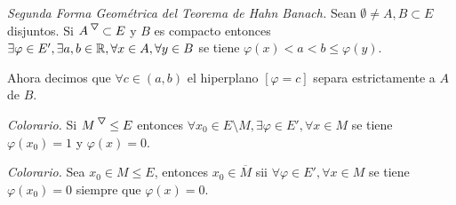 \begin{theorem}
    \emph{Segunda Forma Geométrica del Teorema de Hahn Banach.} Sean \(\emptyset \neq A,B \subset E\) disjuntos. Si \(A^\ce\subset E\) y \(B\) es compacto entonces \(\exists \varphi \in E', \exists a,b \in \mathbb{R}, \forall x\in A, \forall y\in B\) se tiene \(\varphi(x) < a <b \leq \varphi(y)\). 
\end{theorem}
\begin{note}
    Ahora decimos que \(\forall c\in (a,b)\) el hiperplano \([\varphi = c]\) separa estrictamente a \(A\) de \(B\). 
\end{note}
\begin{note}
    \emph{Colorario.} Si \(M^\ce\leq E\) entonces \(\forall x_0\in E\setminus M,\exists \varphi \in E', \forall x\in M\) se tiene \(\varphi(x_0)=1\) y \(\varphi(x) = 0\). 
\end{note}
\begin{note}
    \emph{Colorario.} Sea \(x_0\in M\leq E\), entonces \(x_0\in \overline{M}\) sii \(\forall \varphi \in E', \forall x\in M\) se tiene \(\varphi(x_0) = 0\) siempre que \(\varphi(x)=0\). 
\end{note}